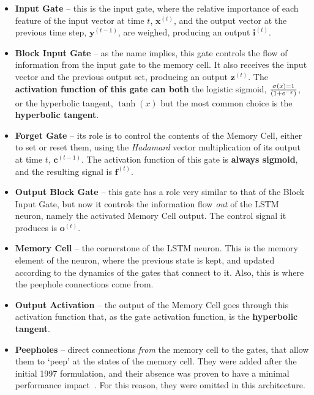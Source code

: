 \documentclass{IEEEtran}
\newcommand{\mb}[1]{\mathbf{#1}}
\begin{document}
\begin{itemize}
    \item \textbf{Input Gate} -- this is the input gate, where the relative importance of each feature of
the input vector at time $t$, $\mb{x}^{(t)}$, and the output vector at the previous time step, $\mb{y}^{(t-1)}$,
are weighed, producing an output $\mb{i}^{(t)}$.

    \item \textbf{Block Input Gate} -- as the name implies, this gate controls the flow of information
from the input gate to the memory cell. It also receives the input vector and the previous output
set, producing an output $\mb{z}^{(t)}$. The \textbf{activation function of this gate can both} the logistic
sigmoid, $\sigma(x) = 1 \over (1+e^{-x})$, or the hyperbolic tangent, $\tanh(x)$ but the most common choice is the
\textbf{hyperbolic tangent}.

    \item \textbf{Forget Gate} -- its role is to control the contents of the Memory Cell, either to
set or reset them, using the \textit{Hadamard} vector multiplication of its output at time
$t$, $\mb{c}^{(t-1)}$. The activation function of this gate is \textbf{always sigmoid}, and the resulting
signal is $\mb{f}^{(t)}$.

    \item \textbf{Output Block Gate} -- this gate has a role very similar to that of the Block Input
Gate, but now it controls the information flow \textit{out} of the LSTM neuron, namely the activated
Memory Cell output. The control signal it produces is $\mb{o}^{(t)}$.

    \item \textbf{Memory Cell} -- the cornerstone of the LSTM neuron. This is the memory element of
the neuron, where the previous state is kept, and updated according to the dynamics of the gates
that connect to it. Also, this is where the peephole connections come from.

    \item \textbf{Output Activation} -- the output of the Memory Cell goes through this activation
function that, as the gate activation function, is the \textbf{hyperbolic tangent}.

    \item \textbf{Peepholes} -- direct connections \textit{from} the memory cell to the gates, that allow them
to `peep' at the states of the memory cell. They were added after the initial 1997 formulation, and their
absence was proven to have a minimal performance impact~\cite{Greff15}. For this reason, they were omitted
in this architecture.

\end{itemize}
\end{document}
